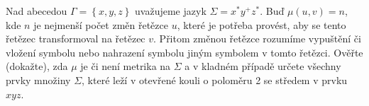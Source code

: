 Nad abecedou $\Gamma =\left \{ x,y,z \right \}$ uvažujeme jazyk
$\Sigma=x^{*}y^{+}z^{*}$. Buď $\mu (u,v)=n$, kde $n$ je nejmenší počet změn
řetězce $u$, které je potřeba provést, aby se tento řetězec transformoval na
řetězec $v$. Přitom změnou řetězce rozumíme vypuštění či vložení symbolu nebo
nahrazení symbolu jiným symbolem v tomto řetězci. Ověřte (dokažte), zda $\mu$ je
či není metrika na $\Sigma$ a v kladném případě určete všechny prvky množiny
$\Sigma$, které leží v otevřené kouli o poloměru 2 se středem v prvku $xyz$.
